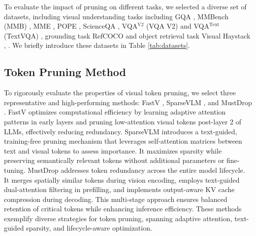 To evaluate the impact of pruning on different tasks, we selected a diverse set of datasets, including visual understanding tasks including GQA \citep{hudson2019gqa}, MMBench (MMB) \citep{liu2025mmbench}, MME \citep{fu2023mme}, POPE \citep{li2023evaluating}, ScienceQA \citep{lu2022learn}, VQA$^{\text{V2}}$ (VQA V2) \citep{goyal2017making} and VQA$^{\text{Text}}$ (TextVQA) \citep{singh2019towards}, grounding task RefCOCO \citep{yu2016modelingcontextreferringexpressions, mao2016generationcomprehensionunambiguousobject} and object retrieval task Visual Haystack \citep{wu2025visual}, . We briefly introduce these datasets in Table \ref{tab:datasets}.


% 

\subsection{Token Pruning Method}

To rigorously evaluate the properties of visual token pruning, we select three representative and high-performing methods: FastV \citep{chen2024image}, SparseVLM \cite{zhang2024sparsevlm}, and MustDrop \citep{liu2024multi}.
FastV \cite{chen2024image} optimizes computational efficiency by learning adaptive attention patterns in early layers and pruning low-attention visual tokens post-layer 2 of LLMs, effectively reducing redundancy.
SparseVLM \citep{zhang2024sparsevlm} introduces a text-guided, training-free pruning mechanism that leverages self-attention matrices between text and visual tokens to assess importance. It maximizes sparsity while preserving semantically relevant tokens without additional parameters or fine-tuning.
MustDrop \citep{liu2024multi} addresses token redundancy across the entire model lifecycle. It merges spatially similar tokens during vision encoding, employs text-guided dual-attention filtering in prefilling, and implements output-aware KV cache compression during decoding. This multi-stage approach ensures balanced retention of critical tokens while enhancing inference efficiency.
These methods exemplify diverse strategies for token pruning, spanning adaptive attention, text-guided sparsity, and lifecycle-aware optimization.
















